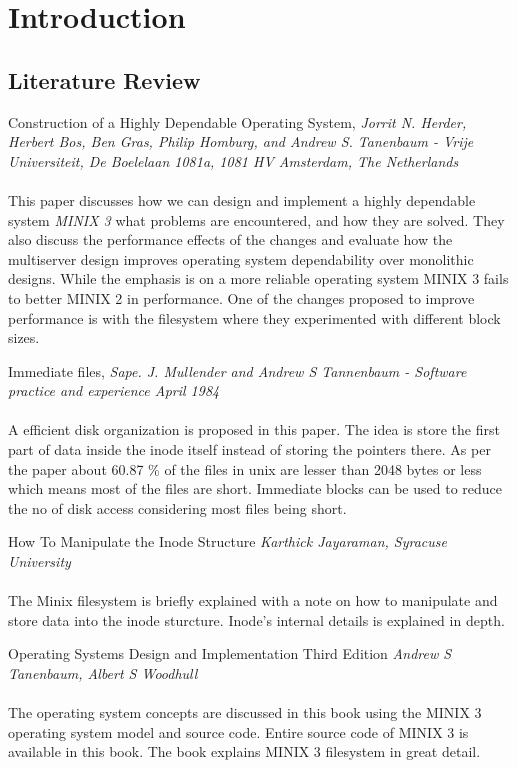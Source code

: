 \chapter{Introduction}

\section{Literature Review}
\vspace{10mm}
 Construction of a Highly Dependable Operating System, { \em Jorrit N. Herder, Herbert Bos, Ben Gras, Philip Homburg, and Andrew S. Tanenbaum - Vrije Universiteit, De Boelelaan 1081a, 1081 HV Amsterdam, The Netherlands
}\cite{chdos}
\\
\\
This paper discusses how we can design and implement a highly dependable system { \em MINIX 3} what problems are encountered, and how they are solved. They also discuss the performance effects of the changes and evaluate how the multiserver design improves operating system dependability over monolithic designs. While the emphasis is on a more reliable operating system MINIX 3 fails to better MINIX 2 in performance. One of the changes proposed to improve performance is with the filesystem where they experimented with different block sizes.

\vspace{10mm}

Immediate files, { \em  Sape. J. Mullender and Andrew S Tannenbaum - Software practice and experience April 1984 }\cite{astimme}
\\
\\
A efficient disk organization is proposed in this paper. The idea is store the first part of data inside the inode itself instead of storing the pointers there. As per the paper about 60.87 \% of the files in unix are lesser than 2048 bytes or less which means most of the files are short. Immediate blocks can be used to reduce the no of disk access considering most files being short.

\pagebreak
How To Manipulate the Inode Structure  { \em Karthick Jayaraman, Syracuse University } \cite{inode}
\\ 
\\
The Minix filesystem is briefly explained with a note on how to manipulate and store data into the inode sturcture. Inode's internal details is explained in depth.

\vspace{10mm}

Operating Systems Design and Implementation Third Edition { \em Andrew S Tanenbaum, Albert S Woodhull }
\\
\\
The operating system concepts are discussed in this book using the MINIX 3 operating system model and source code. Entire source code of MINIX 3 is available in this book. The book explains MINIX 3 filesystem in great detail. 



